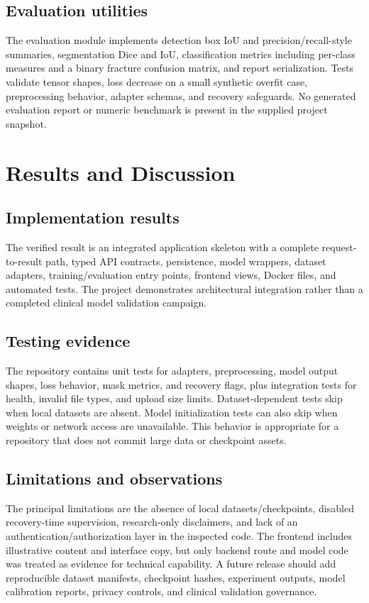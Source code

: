 \documentclass[12pt,a4paper]{article}
\begin{document}
\subsection{Evaluation utilities}
The evaluation module implements detection box IoU and precision/recall-style summaries, segmentation Dice and IoU, classification metrics including per-class measures and a binary fracture confusion matrix, and report serialization. Tests validate tensor shapes, loss decrease on a small synthetic overfit case, preprocessing behavior, adapter schemas, and recovery safeguards. No generated evaluation report or numeric benchmark is present in the supplied project snapshot.

\section{Results and Discussion}
\subsection{Implementation results}
The verified result is an integrated application skeleton with a complete request-to-result path, typed API contracts, persistence, model wrappers, dataset adapters, training/evaluation entry points, frontend views, Docker files, and automated tests. The project demonstrates architectural integration rather than a completed clinical model validation campaign.

\subsection{Testing evidence}
The repository contains unit tests for adapters, preprocessing, model output shapes, loss behavior, mask metrics, and recovery flags, plus integration tests for health, invalid file types, and upload size limits. Dataset-dependent tests skip when local datasets are absent. Model initialization tests can also skip when weights or network access are unavailable. This behavior is appropriate for a repository that does not commit large data or checkpoint assets.

\subsection{Limitations and observations}
The principal limitations are the absence of local datasets/checkpoints, disabled recovery-time supervision, research-only disclaimers, and lack of an authentication/authorization layer in the inspected code. The frontend includes illustrative content and interface copy, but only backend route and model code was treated as evidence for technical capability. A future release should add reproducible dataset manifests, checkpoint hashes, experiment outputs, model calibration reports, privacy controls, and clinical validation governance.
\end{document}
